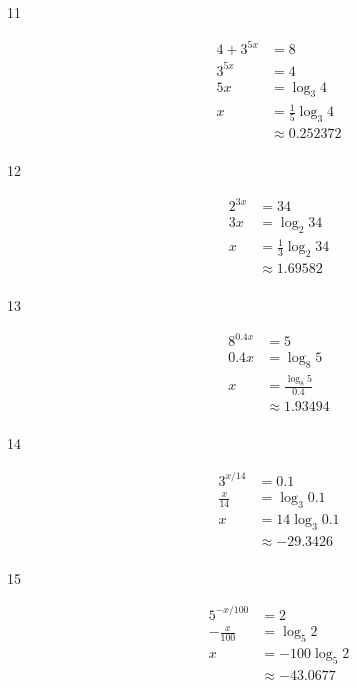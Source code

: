 \documentclass{exam}
\begin{document}
\begin{description}
      \item[11]
        \begin{align*}
          4 + 3^{5x} &= 8 \\
          3^{5x}     &= 4 \\
          5x         &= \log_3 4 \\
          x          &= \frac{1}{5} \log_3 4 \\
                     &\approx \boxed{0.252372} \\
        \end{align*}

      \item[12]
        \begin{align*}
          2^{3x} &= 34 \\
          3x     &= \log_2 34 \\
          x      &= \frac{1}{3} \log_2 34 \\
                 &\approx \boxed{1.69582} \\
        \end{align*}

      \item[13]
        \begin{align*}
          8^{0.4x} &= 5 \\
          0.4x &= \log_8 5 \\
          x    &= \frac{\log_8 5}{0.4} \\
               &\approx \boxed{1.93494} \\
        \end{align*}

      \item[14]
        \begin{align*}
          3^{x/14}     &= 0.1 \\
          \frac{x}{14} &= \log_3 0.1 \\
          x            &= 14 \log_3 0.1 \\
                       &\approx \boxed{-29.3426} \\
        \end{align*}

      \item[15]
        \begin{align*}
          5^{-x/100}     &= 2 \\
          -\frac{x}{100} &= \log_5 2 \\
          x              &= -100 \log_5 2 \\
                         &\approx \boxed{-43.0677} \\
        \end{align*}


\end{description}
\end{document}

